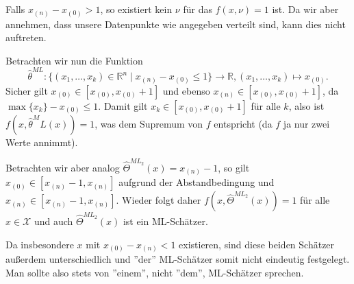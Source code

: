\documentclass[a4paper]{article}
\begin{document}
\begin{enumerate}
    Falls  $x_{(n)} - x_{(0)} > 1$, so existiert kein $\nu$ für das $f(x, \nu) = 1$ ist.
    Da wir aber annehmen, dass unsere Datenpunkte wie angegeben verteilt sind, kann dies nicht auftreten. 

    Betrachten wir nun die Funktion
    \begin{equation*}
        \hat{\theta}^{ML}: \{ (x_1, \dots, x_k) \in \mathds{R}^n \mid x_{(n)} - x_{(0)} \leq 1 \} \to \mathds{R}, (x_1, \dots, x_k) \mapsto x_{(0)} \text{.}
    \end{equation*}
    Sicher gilt $x_{(0)} \in [x_{(0)}, x_{(0)} + 1]$ und ebenso $x_{(n)} \in [x_{(0)}, x_{(0)} + 1]$, da $\max \{x_k\} - x_{(0)} \leq 1$.
    Damit gilt $x_k \in [x_{(0)}, x_{(0)} + 1]$ für alle $k$, also ist $f(x, \hat{\theta}^ML(x)) = 1$, was dem Supremum von $f$ entspricht (da $f$ ja nur zwei Werte annimmt).

    Betrachten wir aber analog $\hat{\Theta}^{ML_2}(x) = x_{(n)} - 1$, so gilt $x_{(0)} \in [x_{(n)} - 1, x_{(n)}]$ aufgrund der Abstandbedingung und $x_{(n)} \in [x_{(n)} - 1, x_{(n)}]$.
    Wieder folgt daher $f(x, \hat{\Theta}^{ML_2}(x)) = 1$ für alle $x \in \mathcal{X}$ und auch $\hat{\Theta}^{ML_2}(x)$ ist ein ML-Schätzer.

    Da insbesondere $x$ mit $x_{(0)} - x_{(n)} < 1$ existieren, sind diese beiden Schätzer außerdem unterschiedlich und ''der'' ML-Schätzer somit nicht eindeutig festgelegt. Man sollte also stets von ''einem'', nicht ''dem'', ML-Schätzer sprechen.
\end{enumerate}
\end{document}
